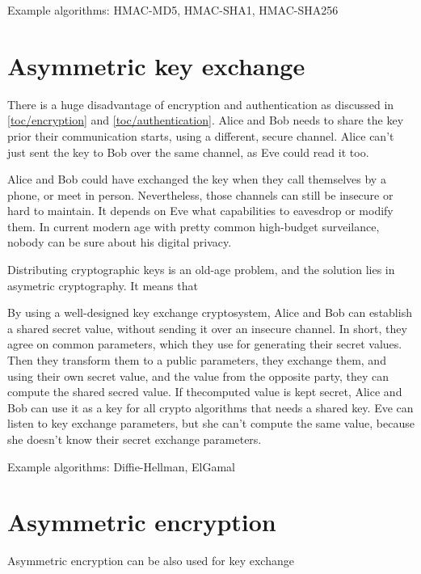 Example algorithms: HMAC-MD5, HMAC-SHA1, HMAC-SHA256





\section{Asymmetric key exchange}

There is a huge disadvantage of encryption and authentication as discussed in \autoref{toc/encryption} and \autoref{toc/authentication}. Alice and Bob needs to share the key prior their communication starts, using a different, secure channel. Alice can't just sent the key to Bob over the same channel, as Eve could read it too.

Alice and Bob could have exchanged the key when they call themselves by a phone, or meet in person. Nevertheless, those channels can still be insecure or hard to maintain. It depends on Eve what capabilities to eavesdrop or modify them. In current modern age with pretty common high-budget surveilance, nobody can be sure about his digital privacy.

Distributing cryptographic keys is an old-age problem, and the solution lies in asymetric cryptography. It means that

By using a well-designed key exchange cryptosystem, Alice and Bob can establish a shared secret value, without sending it over an insecure channel. In short, they agree on common parameters, which they use for generating their secret values. Then they transform them to a public parameters, they exchange them, and using their own secret value, and the value from the opposite party, they can compute the shared secred value. If thecomputed value is kept secret, Alice and Bob can use it as a key for all crypto algorithms that needs a shared key. Eve can listen to key exchange parameters, but she can't compute the same value, because she doesn't know their secret exchange parameters.


Example algorithms: Diffie-Hellman, ElGamal


\section{Asymmetric encryption}

Asymmetric encryption can be also used for key exchange


